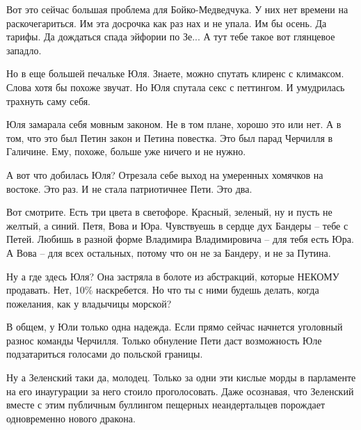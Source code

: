 Вот это сейчас большая проблема для Бойко-Медведчука. У них нет времени на
раскочегариться. Им эта досрочка как раз нах и не упала. Им бы осень. Да
тарифы. Да дождаться спада эйфории по Зе... А тут тебе такое вот глянцевое
западло.

Но в еще большей печальке Юля. Знаете, можно спутать клиренс с климаксом. Слова
хотя бы похоже звучат. Но Юля спутала секс с петтингом. И умудрилась трахнуть
саму себя.

Юля замарала себя мовным законом. Не в том плане, хорошо это или нет. А в том,
что это был Петин закон и Петина повестка. Это был парад Черчилля в Галичине.
Ему, похоже, больше уже ничего и не нужно.

А вот что добилась Юля? Отрезала себе выход на умеренных хомячков на востоке.
Это раз. И не стала патриотичнее Пети. Это два.

Вот смотрите. Есть три цвета в светофоре. Красный, зеленый, ну и пусть не
желтый, а синий. Петя, Вова и Юра. Чувствуешь в сердце дух Бандеры – тебе с
Петей. Любишь в разной форме Владимира Владимировича – для тебя есть Юра. А
Вова – для всех остальных, потому что он не за Бандеру, и не за Путина.

Ну а где здесь Юля? Она застряла в болоте из абстракций, которые НЕКОМУ
продавать. Нет, 10\% наскребется. Но что ты с ними будешь делать, когда
пожелания, как у владычицы морской?

В общем, у Юли только одна надежда. Если прямо сейчас начнется уголовный разнос
команды Черчилля. Только обнуление Пети даст возможность Юле подзатариться
голосами до польской границы.

Ну а Зеленский таки да, молодец. Только за одни эти кислые морды в парламенте
на его инаугурации за него стоило проголосовать. Даже осознавая, что Зеленский
вместе с этим публичным буллингом пещерных неандертальцев порождает
одновременно нового дракона.

